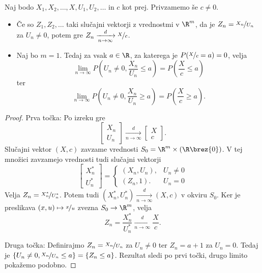 \begin{trditev}
  Naj bodo $X_1, X_2, \ldots, X, U_1, U_2, \ldots$ in $c$ kot prej.
  Privzamemo še $c \ne 0$.
  \begin{itemize}
  \item Če so $Z_1, Z_2, \ldots$ taki slučajni vektorji z vrednostmi v $\R^m$,
	da je $Z_n = \nicefrac{X_n}{U_n}$ za $U_n \ne 0$, potem gre $Z_n
	\xrightarrow[n \to \infty]{d} \nicefrac{X}{c}$.
  \item Naj bo $m = 1$.
	Tedaj za vsak $a \in \R$, za katerega je $P(\nicefrac{X}{c} = a) = 0$, velja
	\[
	  \lim_{n \to \infty} P\!\left(U_n \ne 0, \frac{X_n}{U_n} \le a\right) =
	  P\!\left(\frac{X}{c} \le a \right)
	\]
	ter
	\[
	  \lim_{n \to \infty} P\!\left( U_n \ne 0, \frac{X_n}{U_n} \ge a \right) =
	  P\!\left(\frac{X}{c} \ge a\right).
	\]
  \end{itemize}
\end{trditev}

\begin{proof}
  Prva točka:
  Po izreku gre
  \[
	\begin{bmatrix}
	  X_n \\ U_n
	\end{bmatrix}
	\xrightarrow[n \to \infty]{d}
	\begin{bmatrix}
	  X \\ c
	\end{bmatrix}.
  \]
  Slučajni vektor $(X, c)$ zavzame vrednosti $S_0 = \R^m \times (\R \brez
  \{0\})$.
  V tej množici zavzamejo vrednosti tudi slučajni vektorji
  \[
	\begin{bmatrix}
	  X_n^* \\ U_n^*
	\end{bmatrix}
	=
	\begin{cases}
	  (X_n, U_n), & U_n \ne 0 \\
	  (Z_n, 1). & U_n = 0
	\end{cases}
  \]
  Velja $Z_n = \nicefrac{X_n^*}{U_n^*}$.
  Potem tudi $(X_n^*, U_n^*) \xrightarrow[n \to \infty]{d} (X, c)$ v okviru
  $S_0$.
  Ker je preslikava $(x, u) \mapsto \nicefrac{x}{u}$ zvezna $S_0 \to \R^m$,
  velja
  \[
	Z_n = \frac{X_n^*}{U_n^*} \xrightarrow[n \to \infty]{d} \frac{X}{c}.
  \]

  Druga točka:
  Definirajmo $Z_n = \nicefrac{X_n}{U_n}$ za $U_n \ne 0$ ter $Z_n = a+1$ za $U_n
  = 0$.
  Tedaj je $\{ U_n \ne 0, \nicefrac{X_n}{U_n} \le a \} = \{ Z_n \le a \}$.
  Rezultat sledi po prvi točki, drugo limito pokažemo podobno.
\end{proof}

